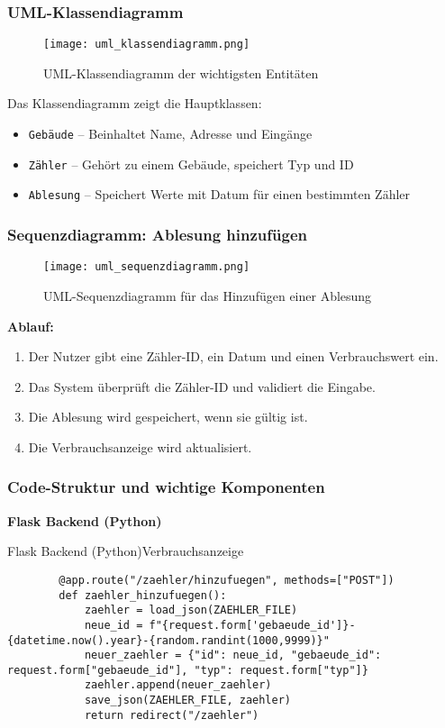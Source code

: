 \subsubsection{UML-Klassendiagramm}

\begin{figure}[h]
    \centering
    \texttt{[image: uml\_klassendiagramm.png]}
    \caption{UML-Klassendiagramm der wichtigsten Entitäten}
\end{figure}

Das Klassendiagramm zeigt die Hauptklassen:
\begin{itemize}
    \item \texttt{Gebäude} – Beinhaltet Name, Adresse und Eingänge
    \item \texttt{Zähler} – Gehört zu einem Gebäude, speichert Typ und ID
    \item \texttt{Ablesung} – Speichert Werte mit Datum für einen bestimmten Zähler
\end{itemize}

\subsubsection{Sequenzdiagramm: Ablesung hinzufügen}

\begin{figure}[h]
    \centering
    \texttt{[image: uml\_sequenzdiagramm.png]}
    \caption{UML-Sequenzdiagramm für das Hinzufügen einer Ablesung}
\end{figure}

\textbf{Ablauf:}
\begin{enumerate}
    \item Der Nutzer gibt eine Zähler-ID, ein Datum und einen Verbrauchswert ein.
    \item Das System überprüft die Zähler-ID und validiert die Eingabe.
    \item Die Ablesung wird gespeichert, wenn sie gültig ist.
    \item Die Verbrauchsanzeige wird aktualisiert.
\end{enumerate}

\subsubsection{Code-Struktur und wichtige Komponenten}

\textbf{Flask Backend (Python)}

\begin{code}{Flask Backend (Python)}{Verbrauchsanzeige}
    \begin{verbatim}
        @app.route("/zaehler/hinzufuegen", methods=["POST"])
        def zaehler_hinzufuegen():
            zaehler = load_json(ZAEHLER_FILE)
            neue_id = f"{request.form['gebaeude_id']}-{datetime.now().year}-{random.randint(1000,9999)}"
            neuer_zaehler = {"id": neue_id, "gebaeude_id": request.form["gebaeude_id"], "typ": request.form["typ"]}
            zaehler.append(neuer_zaehler)
            save_json(ZAEHLER_FILE, zaehler)
            return redirect("/zaehler")
    \end{verbatim}
\end{code}



